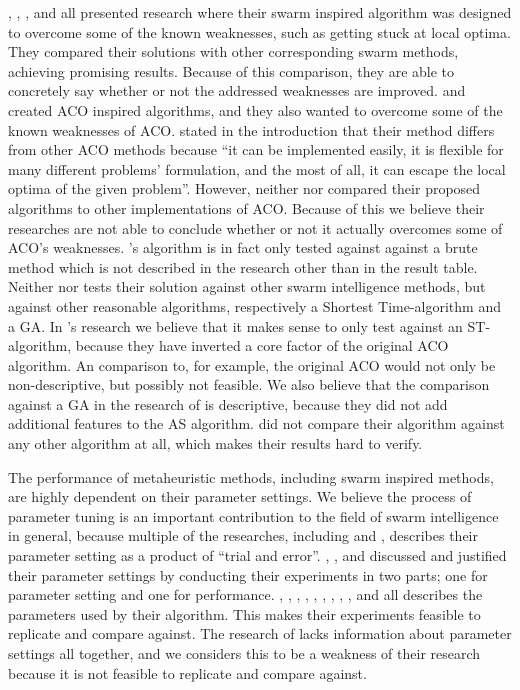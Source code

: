 \citet{tripathi09}, \citet{yang07}, \citet{salehinejad10}, and \citet{jiang10} all presented research where their swarm inspired algorithm was designed to overcome some of the known weaknesses, such as getting stuck at local optima. They compared their solutions with other corresponding swarm methods, achieving promising results. Because of this comparison, they are able to concretely say whether or not the addressed weaknesses are improved. 
\citet{hsiao04} and \citet{sedighpour14} created ACO inspired algorithms, and they also wanted to overcome some of the known weaknesses of ACO. \citet{hsiao04} stated in the introduction that their method differs from other ACO methods because ``it can be implemented easily, it is flexible for many different problems' formulation, and the most of all, it can escape the local optima of the given problem''. However, neither \citet{hsiao04} nor \citet{sedighpour14} compared their proposed algorithms to other implementations of ACO. Because of this we believe their researches are not able to conclude whether or not it actually overcomes some of ACO's weaknesses. \citet{hsiao04}'s algorithm is in fact only tested against against a brute method which is not described in the research other than in the result table. Neither \citet{dias14} nor \citet{poorzahedy11} tests their solution against other swarm intelligence methods, but against other reasonable algorithms, respectively a Shortest Time-algorithm and a GA. In \citet{dias14}'s research we believe that it makes sense to only test against an ST-algorithm, because they have inverted a core factor of the original ACO algorithm. An comparison to, for example, the original ACO would not only be non-descriptive, but possibly not feasible. We also believe that the comparison against a GA in the research of \citet{poorzahedy11} is descriptive, because they did not add additional features to the AS algorithm.\citet{salehi-nezhad07} did not compare their algorithm against any other algorithm at all, which makes their results hard to verify. \newline

The performance of metaheuristic methods, including swarm inspired methods, are highly dependent on their parameter settings. We believe the process of parameter tuning is an important contribution to the field of swarm intelligence in general, because multiple of the researches, including \citet{salehi-nezhad07} and \citet{yang07}, describes their parameter setting as a product of ``trial and error''. \citet{sedighpour14}, \citet{poorzahedy11}, and \citet{kechagiopoulos14} discussed and justified their parameter settings by conducting their experiments in two parts; one for parameter setting and one for performance. \citet{hsiao04}, \citet{salehi-nezhad07}, \citet{tripathi09}, \citet{sedighpour14}, \citet{yang07}, \citet{salehinejad10}, \citet{jiang10}, \citet{poorzahedy11}, \citet{nikolic14}, and \citet{kechagiopoulos14} all describes the parameters used by their algorithm. This makes their experiments feasible to replicate and compare against. The research of \citet{dias14} lacks information about parameter settings all together, and we considers this to be a weakness of their research because it is not feasible to replicate and compare against. \newline

